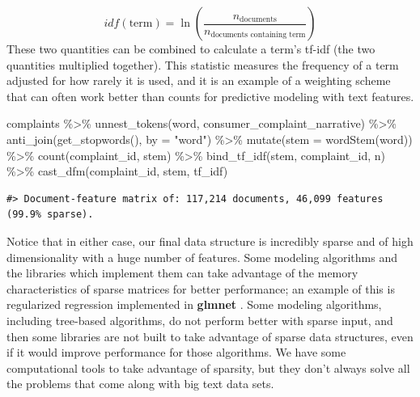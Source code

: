 \documentclass[
]{krantz}
\makeatletter
\newenvironment{Shaded}{\begin{snugshade}}{\end{snugshade}}
\newcommand{\AttributeTok}[1]{\textcolor[rgb]{0.77,0.63,0.00}{#1}}
\newcommand{\FunctionTok}[1]{\textcolor[rgb]{0.00,0.00,0.00}{#1}}
\newcommand{\NormalTok}[1]{#1}
\newcommand{\SpecialCharTok}[1]{\textcolor[rgb]{0.00,0.00,0.00}{#1}}
\newcommand{\StringTok}[1]{\textcolor[rgb]{0.31,0.60,0.02}{#1}}
\newenvironment{kframe}{%
\medskip{}
\setlength{\fboxsep}{.8em}
 \def\at@end@of@kframe{}%
 \ifinner\ifhmode%
  \def\at@end@of@kframe{\end{minipage}}%
  \begin{minipage}{\columnwidth}%
 \fi\fi%
 \def\FrameCommand##1{\hskip\@totalleftmargin \hskip-\fboxsep
 \colorbox{shadecolor}{##1}\hskip-\fboxsep
     \hskip-\linewidth \hskip-\@totalleftmargin \hskip\columnwidth}%
 \MakeFramed {\advance\hsize-\width
   \@totalleftmargin\z@ \linewidth\hsize
   \@setminipage}}%
 {\par\unskip\endMakeFramed%
 \at@end@of@kframe}
\renewenvironment{Shaded}{\begin{kframe}}{\end{kframe}}
\makeatother
\begin{document}
\[idf(\text{term}) = \ln{\left(\frac{n_{\text{documents}}}{n_{\text{documents containing term}}}\right)}\]
These two quantities can be combined to calculate a term's tf-idf (the two quantities multiplied together). This statistic measures the frequency of a term adjusted for how rarely it is used, and it is an example of a weighting scheme that can often work better than counts for predictive modeling with text features.

\begin{Shaded}
\begin{Highlighting}[]
\NormalTok{complaints }\SpecialCharTok{\%\textgreater{}\%}
  \FunctionTok{unnest\_tokens}\NormalTok{(word, consumer\_complaint\_narrative) }\SpecialCharTok{\%\textgreater{}\%}
  \FunctionTok{anti\_join}\NormalTok{(}\FunctionTok{get\_stopwords}\NormalTok{(), }\AttributeTok{by =} \StringTok{"word"}\NormalTok{) }\SpecialCharTok{\%\textgreater{}\%}
  \FunctionTok{mutate}\NormalTok{(}\AttributeTok{stem =} \FunctionTok{wordStem}\NormalTok{(word)) }\SpecialCharTok{\%\textgreater{}\%}
  \FunctionTok{count}\NormalTok{(complaint\_id, stem) }\SpecialCharTok{\%\textgreater{}\%}
  \FunctionTok{bind\_tf\_idf}\NormalTok{(stem, complaint\_id, n) }\SpecialCharTok{\%\textgreater{}\%}
  \FunctionTok{cast\_dfm}\NormalTok{(complaint\_id, stem, tf\_idf)}
\end{Highlighting}
\end{Shaded}

\begin{verbatim}
#> Document-feature matrix of: 117,214 documents, 46,099 features (99.9% sparse).
\end{verbatim}

Notice that in either case, our final data structure is incredibly sparse and of high dimensionality with a huge number of features. Some modeling algorithms and the libraries which implement them can take advantage of the memory characteristics of sparse matrices for better performance; an example of this is regularized regression implemented in \textbf{glmnet} \citep{Friedman2010}. Some modeling algorithms, including tree-based algorithms, do not perform better with sparse input, and then some libraries are not built to take advantage of sparse data structures, even if it would improve performance for those algorithms. We have some computational tools to take advantage of sparsity, but they don't always solve all the problems that come along with big text data sets.
\end{document}

